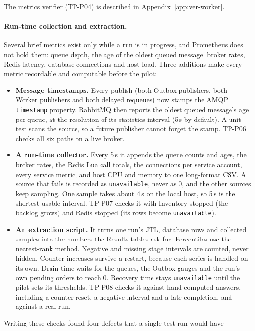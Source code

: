 \documentclass[a4paper]{report}
\begin{document}
The metrics verifier (TP-P04) is described in Appendix~\ref{app:ver-worker}.

\paragraph{Run-time collection and extraction.} Several brief
metrics exist only while a run is in progress, and Prometheus does not hold
them: queue depth, the age of the oldest queued message, broker rates, Redis
latency, database connections and host load. Three additions make every metric
recordable and computable before the pilot:
\begin{itemize}
  \item \textbf{Message timestamps.} Every publish (both Outbox publishers,
    both Worker publishers and both delayed requeues) now stamps the AMQP
    \texttt{timestamp} property. RabbitMQ then reports the oldest queued
    message's age per queue, at the resolution of its statistics interval
    (5\,s by default). A unit test scans the source, so a future publisher
    cannot forget the stamp. TP-P06 checks all six paths on a live broker.
  \item \textbf{A run-time collector.} Every 5\,s it appends the
    queue counts and ages, the broker rates, the Redis Lua call totals, the
    connections per service account, every service metric, and host CPU and
    memory to one long-format CSV. A source that fails is recorded as
    \texttt{unavailable}, never as 0, and the other sources keep sampling.
    One sample takes about 4\,s on the local host, so 5\,s is the shortest
    usable interval. TP-P07 checks it with Inventory stopped (the backlog
    grows) and Redis stopped (its rows become \texttt{unavailable}).
  \item \textbf{An extraction script.} It turns one run's JTL,
    database rows and collected samples into the numbers the Results tables
    ask for. Percentiles use the nearest-rank method. Negative and missing
    stage intervals are counted, never hidden. Counter increases survive a
    restart, because each series is handled on its own. Drain time waits for
    the queues, the Outbox gauges and the run's own pending orders to reach
    0. Recovery time stays \texttt{unavailable} until the pilot sets its
    thresholds. TP-P08 checks it against hand-computed answers, including a
    counter reset, a negative interval and a late completion, and against a
    real run.
\end{itemize}
Writing these checks found four defects that a single test run would have
\end{document}
